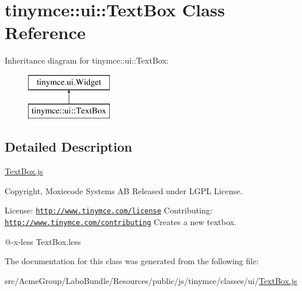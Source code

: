 \hypertarget{classtinymce_1_1ui_1_1_text_box}{\section{tinymce\+:\+:ui\+:\+:Text\+Box Class Reference}
\label{classtinymce_1_1ui_1_1_text_box}
}
Inheritance diagram for tinymce\+:\+:ui\+:\+:Text\+Box\+:\begin{figure}[H]
\begin{center}
\leavevmode
\includegraphics[height=2.000000cm]{classtinymce_1_1ui_1_1_text_box}
\end{center}
\end{figure}


\subsection{Detailed Description}
\hyperlink{_text_box_8js}{Text\+Box.\+js}

Copyright, Moxiecode Systems A\+B Released under L\+G\+P\+L License.

License\+: \href{http://www.tinymce.com/license}{\tt http\+://www.\+tinymce.\+com/license} Contributing\+: \href{http://www.tinymce.com/contributing}{\tt http\+://www.\+tinymce.\+com/contributing} Creates a new textbox.

@-\/x-\/less Text\+Box.\+less 

The documentation for this class was generated from the following file\+:\begin{DoxyCompactItemize}
\item 
src/\+Acme\+Group/\+Labo\+Bundle/\+Resources/public/js/tinymce/classes/ui/\hyperlink{_text_box_8js}{Text\+Box.\+js}\end{DoxyCompactItemize}
